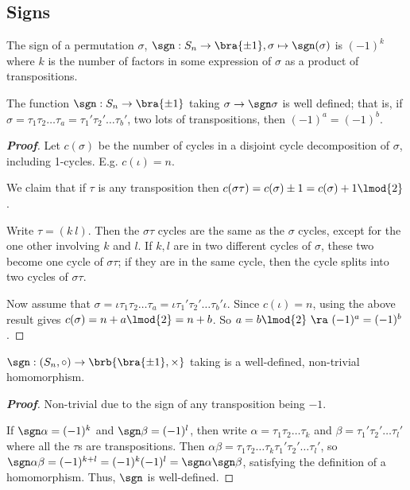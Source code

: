 \subsection{Signs}\label{subsec:sign_groups}

\begin{definition}\label{def:sign_permutation}
The sign of a permutation $\sigma$, $\sgn:S_n \to \bra{\pm 1}, \sigma\mapsto \sgn(\sigma)$ is $(-1)^k$ where $k$ is the number of factors in some expression of $\sigma$ as a product of transpositions.
\end{definition}


\begin{lemma}
The function $\sgn:S_n \to \bra{\pm 1}$ taking $\sigma \to \sgn \sigma$ is well defined; that is, if $\sigma = \tau_1 \tau_2 \dots \tau_a = \tau_1'\tau_2' \dots \tau_b'$, two lots of transpositions, then $(-1)^a = (-1)^b$.
\end{lemma}

\begin{proof}[\bf Proof]
Let $c(\sigma)$ be the number of cycles in a disjoint cycle decomposition of $\sigma$, including 1-cycles. E.g. $c(\iota) = n$.

We claim that if $\tau$ is any transposition then $c(\sigma\tau) = c(\sigma)\pm 1 = c(\sigma)+1 \lmod{2}$.

Write $\tau = (k\ l)$. Then the $\sigma \tau$ cycles are the same as the $\sigma$ cycles, except for the one other involving $k$ and $l$. If $k,l$ are in two different cycles of $\sigma$, these two become one cycle of $\sigma \tau$; if they are in the same cycle, then the cycle splits into two cycles of $\sigma \tau$.

Now assume that $\sigma = \iota \tau_1\tau_2 \dots \tau_a = \iota\tau_1' \tau_2' \dots \tau_b'\iota$. Since $c(\iota) =n$, using the above result gives $c(\sigma) = n+a\lmod{2} = n+b$. So $a = b \lmod{2} \ \ra \ (-1)^a = (-1)^b$.
\end{proof}

\begin{theorem}\label{thm:sgn_homomorphism}
$\sgn:(S_n,\circ) \to \brb{\bra{\pm 1},\times}$ taking is a well-defined, non-trivial homomorphism.
\end{theorem}

\begin{proof}[\bf Proof]
Non-trivial due to the sign of any transposition being $-1$.

If $\sgn \alpha = (-1)^k$ and $\sgn \beta = (-1)^l$, then write $\alpha = \tau_1\tau_2 \dots \tau_k$ and $\beta = \tau_1' \tau_2' \dots \tau_l'$ where all the $\tau$s are transpositions. Then $\alpha\beta = \tau_1\tau_2 \dots \tau_k \tau_1' \tau_2' \dots \tau_l'$, so $\sgn \alpha \beta = (-1)^{k+l} = (-1)^k(-1)^l = \sgn \alpha \sgn \beta$, satisfying the definition of a homomorphism. Thus, $\sgn$ is well-defined.
\end{proof}



